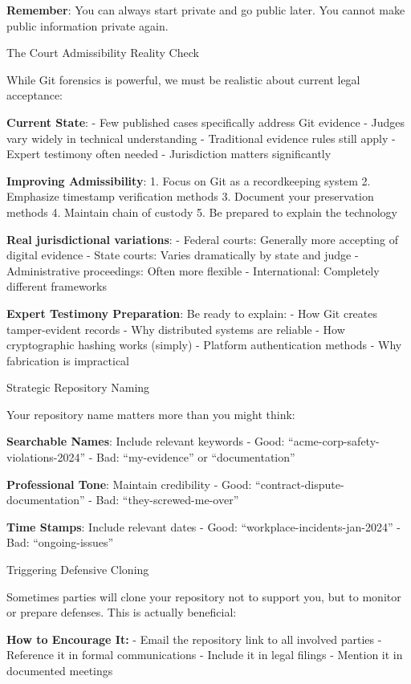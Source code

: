 \textbf{Remember}: You can always start private and go public later. You
cannot make public information private again.

The Court Admissibility Reality Check

While Git forensics is powerful, we must be realistic about current
legal acceptance:

\textbf{Current State}: - Few published cases specifically address Git
evidence - Judges vary widely in technical understanding - Traditional
evidence rules still apply - Expert testimony often needed -
Jurisdiction matters significantly

\textbf{Improving Admissibility}: 1. Focus on Git as a recordkeeping
system 2. Emphasize timestamp verification methods 3. Document your
preservation methods 4. Maintain chain of custody 5. Be prepared to
explain the technology

\textbf{Real jurisdictional variations}: - Federal courts: Generally
more accepting of digital evidence - State courts: Varies dramatically
by state and judge - Administrative proceedings: Often more flexible -
International: Completely different frameworks

\textbf{Expert Testimony Preparation}: Be ready to explain: - How Git
creates tamper-evident records - Why distributed systems are reliable -
How cryptographic hashing works (simply) - Platform authentication
methods - Why fabrication is impractical

Strategic Repository Naming

Your repository name matters more than you might think:

\textbf{Searchable Names}: Include relevant keywords - Good:
``acme-corp-safety-violations-2024'' - Bad: ``my-evidence'' or
``documentation''

\textbf{Professional Tone}: Maintain credibility - Good:
``contract-dispute-documentation'' - Bad: ``they-screwed-me-over''

\textbf{Time Stamps}: Include relevant dates - Good:
``workplace-incidents-jan-2024'' - Bad: ``ongoing-issues''

Triggering Defensive Cloning

Sometimes parties will clone your repository not to support you, but to
monitor or prepare defenses. This is actually beneficial:

\textbf{How to Encourage It:} - Email the repository link to all
involved parties - Reference it in formal communications - Include it in
legal filings - Mention it in documented meetings

